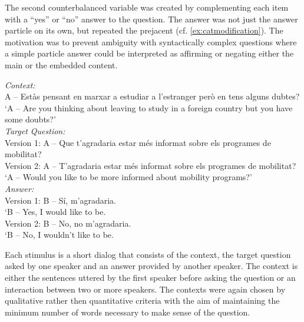 \begin{sloppypar}
The second counterbalanced variable  was created by complementing each item with a ``yes'' or ``no'' answer to the question. The answer was not just the answer particle on its own, but repeated the prejacent (cf. \ref{ex:catmodification}). The motivation was to prevent ambiguity with syntactically complex questions where a simple particle answer could be interpreted as affirming or negating either the main or the embedded content. 
\end{sloppypar}

\ea\label{ex:catmodification}
\textit{Context:} \\
A  – Estàs pensant en marxar a estudiar a l'estranger però en tens alguns dubtes?  \\
`A – Are you thinking about leaving to study in a foreign country but you have some doubts?'\\
\textit{Target Question:}\\
Version 1: A –  Que t'agradaria estar més informat sobre els programes de mobilitat? \\
Version 2: A –  T'agradaria estar més informat sobre els programes de mobilitat? \\
`A – Would you like to be more informed about mobility programs?'\\
\textit{Answer:}\\
Version 1: B – Sí, m’agradaria.\\
`B – Yes, I would like to be.\\
Version 2: B – No, no m’agradaria.\\
`B – No, I wouldn't like to be.\\
\z



Each stimulus is a short dialog that consists of the context, the target question asked by one speaker and an answer provided by another speaker. The context is either  the sentences uttered by the first speaker before asking the question or an interaction between  two or more speakers. The contexts were  again chosen by qualitative rather then quantitative criteria with the aim of maintaining the minimum number of words necessary to make sense of the question.

